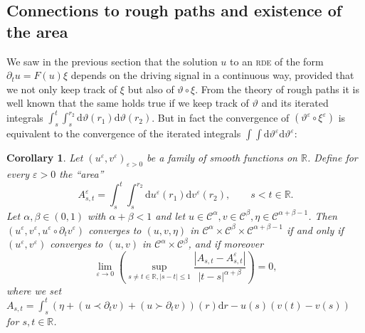 \documentclass[11pt,a4paper]{article}
\newcommand{\mathd}{\mathrm{d}}
\newtheorem{corollary}[theorem]{Corollary}
\theoremstyle{remark}
\newcommand{\CC}{\ensuremath{\mathscr{C}}}
\begin{document}
\subsection{Connections to rough paths and existence of the area}

We saw in the previous section that the solution $u$ to an \textsc{rde} of the form
$\partial_{t} u=F ( u ) \xi$ depends on the driving signal in a continuous way, provided
that we not only keep track of $\xi$ but also of $\vartheta \circ \xi$. From
the theory of rough paths it is well known that the same holds true if we keep
track of $\vartheta$ and its iterated integrals $\int_{s}^{t} \int_{s}^{r_{2}} \mathd \vartheta ( r_{1} ) \mathd \vartheta ( r_{2} )$. But in fact the convergence of $( \vartheta^{\varepsilon} \circ \xi^{\varepsilon} )$
is equivalent to the convergence of the iterated integrals $\int \int \mathd \vartheta^{\varepsilon} \mathd \vartheta^{\varepsilon}$:

\begin{corollary}\label{corollary:classical rough path}
  Let $( u^{\varepsilon} ,v^{\varepsilon} )_{\varepsilon >0}$ be a family of smooth functions on
  $\mathbb{R}$. Define for every $\varepsilon >0$ the ``area''
  \[
     A^{\varepsilon}_{s,t} = \int_{s}^{t} \int_{s}^{r_{2}} \mathd u^{\varepsilon} ( r_{1} ) \mathd v^{\varepsilon} ( r_{2} ) , \hspace{2em} s<t \in \mathbb{R}.
  \]
  Let $\alpha , \beta \in ( 0,1 )$ with $\alpha + \beta <1$ and let $u \in \CC^\alpha ,v \in \CC^\beta , \eta \in \CC^{\alpha + \beta -1}$. Then $( u^{\varepsilon} ,v^{\varepsilon} ,u^{\varepsilon} \circ \partial_{t} v^{\varepsilon} )$ converges to $( u,v, \eta )$ in $\CC^{\alpha} \times \CC^\beta \times \CC^{\alpha + \beta -1}$ if and only if $( u^{\varepsilon},v^{\varepsilon} )$ converges to $( u,v )$ in $\CC^{\alpha} \times \CC^\beta$, and if moreover
  \begin{equation}\label{eq:classical rough path}
     \lim_{\varepsilon \rightarrow 0} \left( \sup_{s \neq t \in \mathbb{R}, | s-t | \leqslant 1} \frac{| A_{s,t} -A^{\varepsilon}_{s,t} |}{| t-s |^{\alpha + \beta}} \right) =0,
  \end{equation}
  where we set $A_{s,t} = \int_{s}^{t} ( \eta + ( u  \prec \partial_{t} v ) + ( u \succ \partial_{t} v ) ) ( r ) \mathd r-u ( s ) ( v ( t ) -v ( s ) ) $ for $s,t \in \mathbb{R}$.
\end{corollary}
\end{document}
